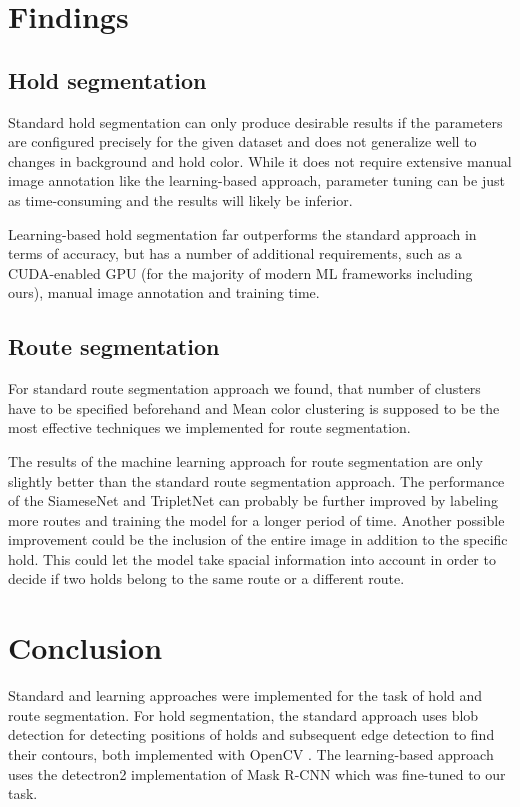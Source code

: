 \documentclass[final]{cvpr}
\begin{document}
\section{Findings}

\subsection{Hold segmentation} %

Standard hold segmentation can only produce desirable results if the parameters are configured precisely for the given dataset and does not generalize well to changes in background and hold color.
While it does not require extensive manual image annotation like the learning-based approach, parameter tuning can be just as time-consuming and the results will likely be inferior.

Learning-based hold segmentation far outperforms the standard approach in terms of accuracy, but has a number of additional requirements, such as a CUDA-enabled GPU (for the majority of modern ML frameworks including ours), manual image annotation and training time.

\subsection{Route segmentation} %
For standard route segmentation approach we found, that number of clusters have to be specified beforehand and Mean color clustering is supposed to be the most effective techniques we implemented for route segmentation.

The results of the machine learning approach for route segmentation are only slightly better than the standard route segmentation approach. The performance of the SiameseNet and TripletNet can probably be further improved by labeling more routes and training the model for a longer period of time. Another possible improvement could be the inclusion of the entire image in addition to the specific hold. This could let the model take spacial information into account in order to decide if two holds belong to the same route or a different route. 

\section{Conclusion} \label{sec:conclusion}

Standard and learning approaches were implemented for the task of hold and route segmentation.
For hold segmentation, the standard approach uses blob detection for detecting positions of holds and subsequent edge detection to find their contours, both implemented with OpenCV \cite{opencv}. The learning-based approach uses the detectron2 implementation of Mask R-CNN \cite{maskrcnn} which was fine-tuned to our task.
\end{document}
